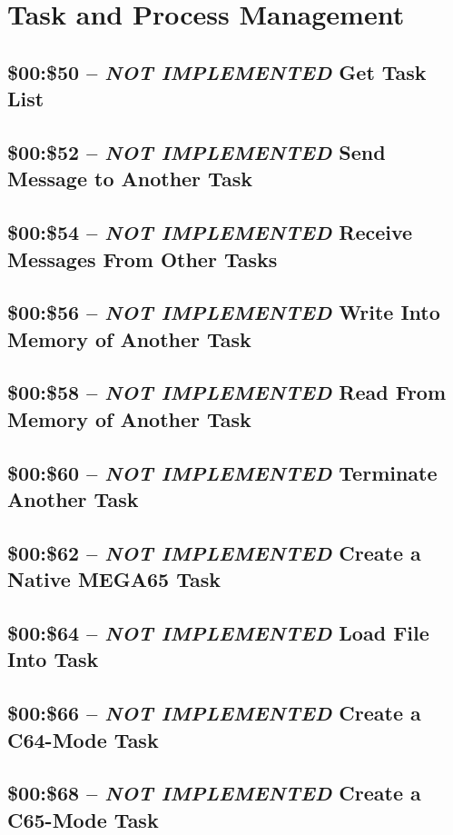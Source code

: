 \section{Task and Process Management}

\subsection{\$00:\$50 -- {\em NOT IMPLEMENTED} Get Task List}
\subsection{\$00:\$52 -- {\em NOT IMPLEMENTED} Send Message to Another Task}
\subsection{\$00:\$54 -- {\em NOT IMPLEMENTED} Receive Messages From Other Tasks}
\subsection{\$00:\$56 -- {\em NOT IMPLEMENTED} Write Into Memory of Another Task}
\subsection{\$00:\$58 -- {\em NOT IMPLEMENTED} Read From Memory of Another Task}

\subsection{\$00:\$60 -- {\em NOT IMPLEMENTED} Terminate Another Task}
\subsection{\$00:\$62 -- {\em NOT IMPLEMENTED} Create a Native MEGA65 Task}
\subsection{\$00:\$64 -- {\em NOT IMPLEMENTED} Load File Into Task}
\subsection{\$00:\$66 -- {\em NOT IMPLEMENTED} Create a C64-Mode Task}
\subsection{\$00:\$68 -- {\em NOT IMPLEMENTED} Create a C65-Mode Task}
